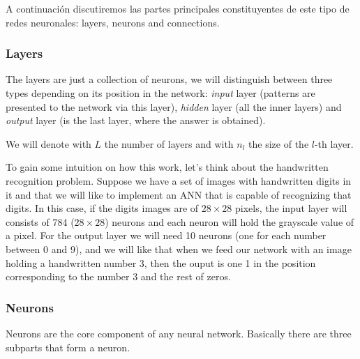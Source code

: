 A continuación discutiremos las partes principales constituyentes de este tipo
de redes neuronales: layers, neurons and connections.

\subsubsection{Layers}
The layers are just a collection of neurons, we will distinguish between three
types depending on its position in the network: \emph{input} layer (patterns
are presented to the network via this layer), \emph{hidden} layer (all the
inner layers) and \emph{output} layer (is the last layer, where the answer is
obtained).

We will denote with \(L\) the number of layers and with \(n_l\) the size of the
\(l\)-th layer.

\begin{exampleBox}
  To gain some intuition on how this work, let's think about the handwritten
  recognition problem. Suppose we have a set of images with handwritten digits
  in it and that we will like to implement an ANN that is capable of
  recognizing that digits. In this case, if the digits images are of
  \(28 \times 28\) pixels, the input layer will consists of 784
  (\(28 \times 28\)) neurons and each neuron will hold the grayscale value of a
  pixel. For the output layer we will need 10 neurons (one for each number
  between 0 and 9), and we will like that when we feed our network with an
  image holding a handwritten number 3, then the ouput is one 1 in the position
  corresponding to the number 3 and the rest of zeros.
\end{exampleBox}

\subsubsection{Neurons}
Neurons are the core component of any neural network. Basically there are three
subparts that form a neuron.

